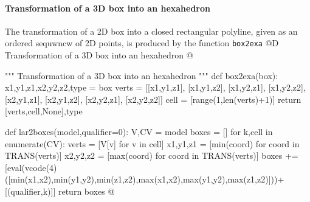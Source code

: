 \documentclass[11pt,oneside]{article}    %
\begin{document}
    
\paragraph{Transformation of a 3D box into an hexahedron}
The transformation of a 2D box into a closed rectangular polyline, given as an ordered sequwncw of 2D points, is produced by the function \texttt{box2exa}
@D Transformation of a 3D box into an hexahedron
@{""" Transformation of a 3D box into an hexahedron """    
def box2exa(box):
    x1,y1,z1,x2,y2,z2,type = box
    verts = [[x1,y1,z1], [x1,y1,z2], [x1,y2,z1], [x1,y2,z2], [x2,y1,z1], [x2,y1,z2], [x2,y2,z1], [x2,y2,z2]]
    cell = [range(1,len(verts)+1)]
    return [verts,cell,None],type

def lar2boxes(model,qualifier=0):
    V,CV = model
    boxes = []
    for k,cell in enumerate(CV):
        verts = [V[v] for v in cell]
        x1,y1,z1 = [min(coord) for coord in TRANS(verts)]
        x2,y2,z2 = [max(coord) for coord in TRANS(verts)]
        boxes += [eval(vcode(4)([min(x1,x2),min(y1,y2),min(z1,z2),max(x1,x2),max(y1,y2),max(z1,z2)]))+[(qualifier,k)]]
    return boxes
@}



\end{document}
